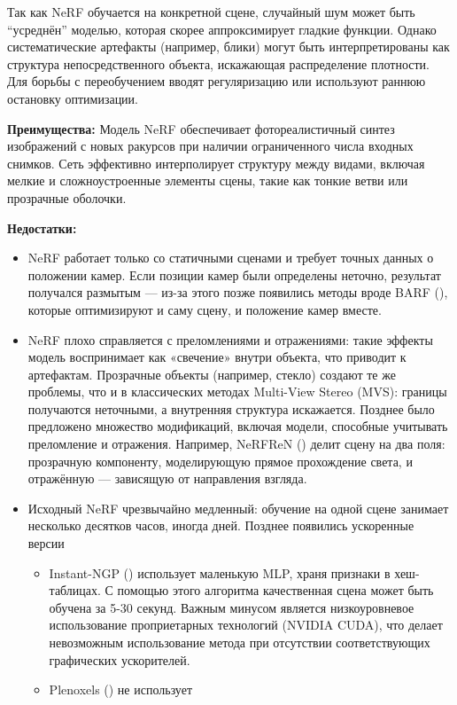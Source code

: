 Так как NeRF обучается на конкретной сцене, случайный шум может быть ``усреднён''
моделью, которая скорее аппроксимирует гладкие функции. Однако систематические
артефакты (например, блики) могут быть интерпретированы как структура
непосредственного объекта, искажающая распределение плотности. Для борьбы с
переобучением вводят регуляризацию или используют раннюю остановку оптимизации.

\textbf{Преимущества:}
Модель NeRF обеспечивает фотореалистичный синтез изображений с новых ракурсов
при наличии ограниченного числа входных снимков. Сеть эффективно интерполирует
структуру между видами, включая мелкие и сложноустроенные элементы сцены, такие
как тонкие ветви или прозрачные оболочки.

\textbf{Недостатки:}
\begin{itemize}
	\item NeRF работает только со статичными сценами и требует точных данных о
	положении камер. Если позиции камер были определены неточно, результат
	получался размытым — из-за этого позже появились методы вроде BARF
	(\cite{lin2021barfbundleadjustingneuralradiance}), которые оптимизируют и саму
	сцену, и положение камер вместе.
	\item NeRF плохо справляется с преломлениями и отражениями: такие
	эффекты модель воспринимает как «свечение» внутри объекта, что приводит к
	артефактам. Прозрачные объекты (например, стекло) создают те же проблемы,
	что и в классических методах Multi-View Stereo (MVS): границы получаются
	неточными, а внутренняя структура искажается. Позднее было предложено
	множество модификаций, включая модели, способные учитывать преломление и
	отражения. Например, NeRFReN (\cite{guo2022nerfrenneuralradiancefields}) делит сцену
	на два поля: прозрачную компоненту, моделирующую прямое прохождение света, и
	отражённую — зависящую от направления взгляда.
	\item Исходный NeRF чрезвычайно медленный: обучение на одной сцене
	занимает несколько десятков часов, иногда дней. Позднее появились ускоренные версии
	\begin{itemize}
		\item Instant-NGP (\cite{M_ller_2022}) использует маленькую MLP, храня признаки в хеш-таблицах.
		С помощью этого алгоритма качественная сцена может быть обучена за 5-30 секунд.
		Важным минусом является низкоуровневое использование проприетарных технологий (NVIDIA CUDA),
		что делает невозможным использование метода при отсутствии соответствующих графических
		ускорителей.
		\item Plenoxels (\cite{yu2021plenoxelsradiancefieldsneural}) не использует

\end{itemize}
\end{itemize}

